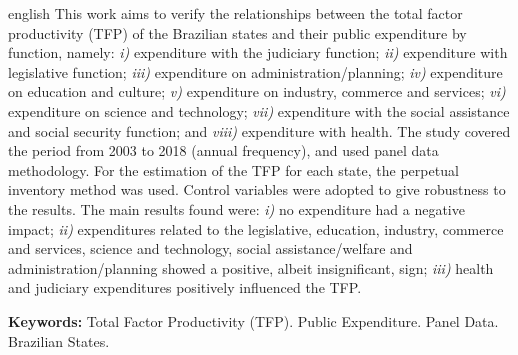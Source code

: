 \documentclass[
  12pt,
  a4paper,
  oneside,
  brazil,
  chapter=TITLE,
  section=TITLE
]{abntex2}
\begin{document}
\begin{resumo}[Abstract]
\begin{otherlanguage*}{english}
This work aims to verify the relationships between the total factor productivity (TFP) of the Brazilian states and their public expenditure by function, namely: \textit{i)} expenditure with the judiciary function; \textit{ii)} expenditure with legislative function; \textit{iii)} expenditure on administration/planning; \textit{iv)} expenditure on education and culture; \textit{v)} expenditure on industry, commerce and services; \textit{vi)} expenditure on science and technology; \textit{vii)} expenditure with the social assistance and social security function; and \textit{viii)} expenditure with health. The study covered the period from 2003 to 2018 (annual frequency), and used panel data methodology. For the estimation of the TFP for each state, the perpetual inventory method was used. Control variables were adopted to give robustness to the results. The main results found were: \textit{i)} no expenditure had a negative impact; \textit{ii)} expenditures related to the legislative, education, industry, commerce and services, science and technology, social assistance/welfare and administration/planning showed a positive, albeit insignificant, sign; \textit{iii)} health and judiciary expenditures positively influenced the TFP.

\vspace{\onelineskip}
\noindent\textbf{Keywords:} Total Factor Productivity (TFP). Public Expenditure. Panel Data. Brazilian States.
\end{otherlanguage*}
\end{resumo}

\listoffigures*
\cleardoublepage
\listoftables*
\cleardoublepage
\end{document}
